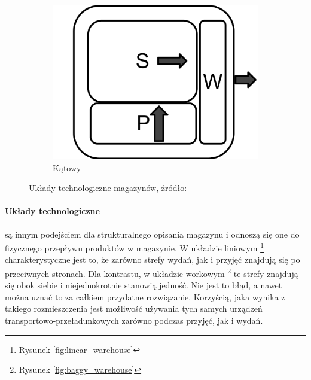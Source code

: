 \begin{figure}[h]
        	\quad
			\begin{subfigure}[b]{0.3\textwidth}
                \centering
                \includegraphics[width=\textwidth]{images/katowy_magazyn}
                \caption{Kątowy}
                \label{fig:angle_warehouse}
        	\end{subfigure}
        	\caption[Układy technologiczne magazynów]{
				Układy technologiczne magazynów, źródło: \cite{PL_FM}        	
        	}
		\end{figure}
		\paragraph{Układy technologiczne} są innym podejściem dla strukturalnego opisania magazynu i odnoszą się
		one do fizycznego przepływu produktów w magazynie. W układzie liniowym \footnote{Rysunek \ref{fig:linear_warehouse}} 
		charakterystyczne jest to, że zarówno strefy wydań, jak i przyjęć znajdują się po przeciwnych stronach. Dla kontrastu,
		w układzie workowym \footnote{Rysunek \ref{fig:baggy_warehouse}} te strefy znajdują się obok siebie i niejednokrotnie
		stanowią jedność. Nie jest to błąd, a nawet można uznać to za całkiem przydatne rozwiązanie. Korzyścią, jaka 
		wynika z takiego rozmieszczenia jest możliwość używania tych samych urządzeń transportowo-przeładunkowych zarówno
		podczas przyjęć, jak i wydań. 
	
